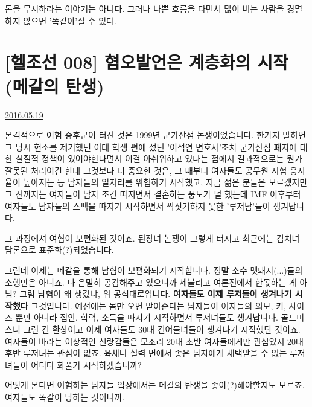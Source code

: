 돈을 무시하라는 이야기는 아니다. 그러나 나쁜 흐름을 타면서 많이 버는 사람을 경멸하지 않으면 '똑같아'질 수 있다.
\vspace{5mm}








\section{[헬조선 008] 혐오발언은 계층화의 시작(메갈의 탄생)}
\href{https://www.kockoc.com/Apoc/782301}{2016.05.19}

\vspace{5mm}

본격적으로 여혐 증후군이 터진 것은 1999년 군가산점 논쟁이었습니다.
한가지 말하면 그 당시 헌소를 제기했던 이대 학생 편에 섰던 '이석연 변호사'조차 군가산점 폐지에 대한 실질적 정책이 있어야한다면서
이걸 아쉬워하고 있다는 점에서 결과적으로는 뭔가 잘못된 처리이긴 한데 그것보다 더 중요한 것은,
그 때부터 여자들도 공무원 시험 응시율이 높아지는 등 남자들의 일자리를 위협하기 시작했고,
지금 젊은 분들은 모르겠지만 그 전까지는 여자들이 남자 조건 따지면서 결혼하는 풍토가 덜 했는데
IMF 이후부터 여자들도 남자들의 스펙을 따지기 시작하면서 짝짓기하지 못한 '루저남'들이 생겨납니다.
\vspace{5mm}

그 과정에셔 여혐이 보편화된 것이죠. 된장녀 논쟁이 그렇게 터지고 최근에는 김치녀 담론으로 표준화(?)되었습니다.
\vspace{5mm}

그런데 이제는 메갈을 통해 남혐이 보편화되기 시작합니다.
정말 소수 멧퇘지(...)들의 소행만은 아니죠. 다 은밀히 공감해주고 있으니까 세불리고 여론전에서 한몫하는 게 아님?
그럼 남혐이 왜 생겼냐, 위 공식대로입니다.
\textbf{여자들도 이제 루저들이 생겨나기 시작했다} 그것입니다.
예전에는 몸만 오면 받아준다는 남자들이 여자들의 외모, 키, 사이즈 뿐만 아니라
집안, 학력, 소득을 따지기 시작하면서 루저녀들도 생겨납니다.
골드미스니 그런 건 환상이고 이제 여자들도 30대 건어물녀들이 생겨나기 시작했단 것이죠.
여자들이 바라는 이상적인 신랑감들은 모조리 20대 초반 여자들에게만 관심있지 20대 후반 루저녀는 관심이 없죠.
육체나 실력 면에서 좋은 남자에게 채택받을 수 없는 루저녀들이 어디다 화풀기 시작하겠습니까?
\vspace{5mm}

어떻게 본다면 여혐하는 남자들 입장에서는 메갈의 탄생을 좋아(?)해야할지도 모르죠. 여자들도 똑같이 당하는 것이니까.
\vspace{5mm}

